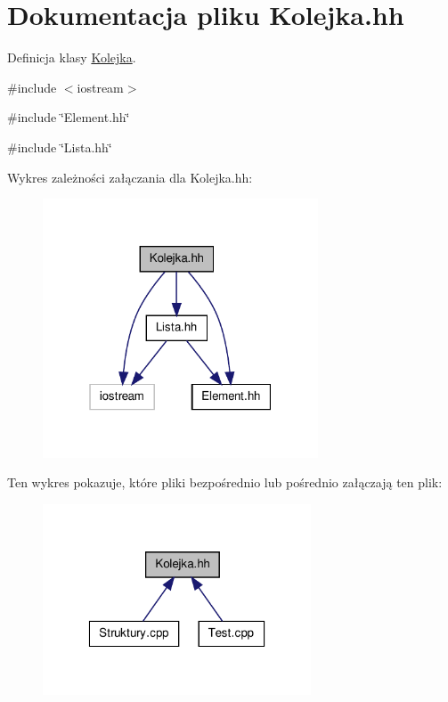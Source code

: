 \hypertarget{_kolejka_8hh}{
\section{Dokumentacja pliku Kolejka.hh}
\label{_kolejka_8hh}
}


Definicja klasy \hyperlink{class_kolejka}{Kolejka}.  


{\ttfamily \#include $<$iostream$>$}\par
{\ttfamily \#include \char`\"{}Element.hh\char`\"{}}\par
{\ttfamily \#include \char`\"{}Lista.hh\char`\"{}}\par
Wykres zależności załączania dla Kolejka.hh:
\nopagebreak
\begin{figure}[H]
\begin{center}
\leavevmode
\includegraphics[width=232pt]{_kolejka_8hh__incl}
\end{center}
\end{figure}
Ten wykres pokazuje, które pliki bezpośrednio lub pośrednio załączają ten plik:
\nopagebreak
\begin{figure}[H]
\begin{center}
\leavevmode
\includegraphics[width=226pt]{_kolejka_8hh__dep__incl}
\end{center}
\end{figure}
